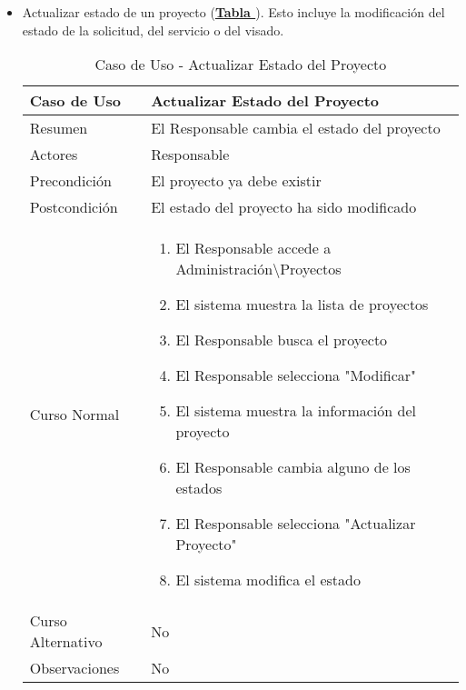 \begin{itemize}
	\item \addtocounter{tabla}{1} Actualizar estado de un proyecto (\textbf{\hyperref[tab:curActualizarProyecto]{Tabla }}). Esto incluye la modificación del estado de la solicitud, del servicio o del visado.
		\begin{table}[!htbp]
		  \centering  \addtocounter{casouso}{1}
		  \begin{tabular}{|l | p{100mm}|}
		    \textbf{Caso de Uso}  & \textbf{Actualizar Estado del Proyecto} \\ \hline
		    Resumen 		 & El Responsable cambia el estado del proyecto \\ \hline
		    Actores  		 & Responsable \\ \hline
		    Precondición  	 & El proyecto ya debe existir  \\ \hline
		    Postcondición  	 & El estado del proyecto ha sido modificado \\ \hline
		    Curso Normal   	 & \begin{enumerate}
			  \item El Responsable accede a Administración\textbackslash Proyectos
			  \item El sistema muestra la lista de proyectos
			  \item El Responsable busca el proyecto
			  \item El Responsable selecciona "Modificar"
			  \item El sistema muestra la información del proyecto
			  \item El Responsable cambia alguno de los estados
			  \item El Responsable selecciona "Actualizar Proyecto"
			  \item El sistema modifica el estado
		    \end{enumerate}  \\ \hline
		    Curso Alternativo  & No  \\ \hline
		    Observaciones 	 & No  \\ \hline
		  \end{tabular}
		  \caption{Caso de Uso  - Actualizar Estado del Proyecto}
		  \label{tab:curActualizarProyecto}
		\end{table}
		\FloatBarrier


\end{itemize}
